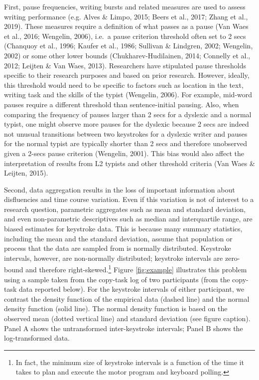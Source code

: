 \documentclass[
  english,
  man,mask,floatsintext]{apa7}
\begin{document}
First, pause frequencies, writing bursts and related measures are used to assess writing performance (e.g. Alves \& Limpo, 2015; Beers et al., 2017; Zhang et al., 2019). These measures require a definition of what passes as a pause (Van Waes et al., 2016; Wengelin, 2006), i.e.~a pause criterion threshold often set to 2 secs (Chanquoy et al., 1996; Kaufer et al., 1986; Sullivan \& Lindgren, 2002; Wengelin, 2002) or some other lower bounds (Chukharev-Hudilainen, 2014; Connelly et al., 2012; Leijten \& Van Waes, 2013). Researchers have stipulated pause thresholds specific to their research purposes and based on prior research. However, ideally, this threshold would need to be specific to factors such as location in the text, writing task and the skills of the typist (Wengelin, 2006). For example, mid-word pauses require a different threshold than sentence-initial pausing. Also, when comparing the frequency of pauses larger than 2 secs for a dyslexic and a normal typist, one might observe more pauses for the dyslexic because 2 secs are indeed not unusual transitions between two keystrokes for a dyslexic writer and pauses for the normal typist are typically shorter than 2 secs and therefore unobserved given a 2-secs pause criterion (Wengelin, 2001). This bias would also affect the interpretation of results from L2 typists and other threshold criteria (Van Waes \& Leijten, 2015).

Second, data aggregation results in the loss of important information about disfluencies and time course variation. Even if this variation is not of interest to a research question, parametric aggregates such as mean and standard deviation, and even non-parametric descriptives such as median and interquartile range, are biased estimates for keystroke data. This is because many summary statistics, including the mean and the standard deviation, assume that population or process that the data are sampled from is normally distributed. Keystroke intervals, however, are non-normally distributed; keystroke intervals are zero-bound and therefore right-skewed.\footnote{In fact, the minimum size of keystroke intervals is a function of the time it takes to plan and execute the motor program and keyboard polling.} Figure \ref{fig:example} illustrates this problem using a sample taken from the copy-task log of two participants (from the copy-task data reported below). For the keystroke intervals of either participant, we contrast the density function of the empirical data (dashed line) and the normal density function (solid line). The normal density function is based on the observed mean (dotted vertical line) and standard deviation (see figure caption). Panel A shows the untransformed inter-keystroke intervals; Panel B shows the log-transformed data.
\end{document}
